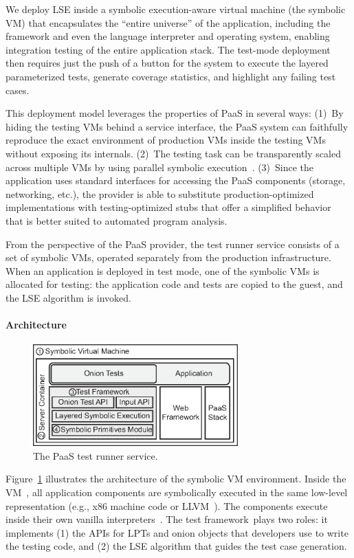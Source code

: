 We deploy LSE inside a symbolic execution-aware virtual machine (the symbolic VM) that encapsulates the ``entire universe'' of the application, including the framework and even the language interpreter and operating system, enabling integration testing of the entire application stack.
%
The test-mode deployment then requires just the push of a button for the system to execute the layered parameterized tests, generate coverage statistics, and highlight any failing test cases.

This deployment model leverages the properties of PaaS in several ways:
%
(1)~By hiding the testing VMs behind a service interface, the PaaS system can faithfully reproduce the exact environment of production VMs inside the testing VMs without exposing its internals.
%
(2)~The testing task can be transparently scaled across multiple VMs by using parallel symbolic execution~\cite{cloud9}.
%
(3)~Since the application uses standard interfaces for accessing the PaaS components (storage, networking, etc.), the provider is able to substitute production-optimized implementations with testing-optimized stubs that offer a simplified behavior that is better suited to automated program analysis.

From the perspective of the PaaS provider, the test runner service consists of a set of symbolic VMs, operated separately from the production infrastructure.  When an application is deployed in test mode, one of the symbolic VMs is allocated for testing: the application code and tests are copied to the guest, and the LSE algorithm is invoked.

\paragraph{Architecture}

\begin{figure}
  \centering
  \includegraphics[width=3.1in]{paas/figures/symbolic-vm}
  \caption{The PaaS test runner service.}
  \label{fig:fse}
\end{figure}

Figure~\ref{fig:fse} illustrates the architecture of the symbolic VM environment.  Inside the VM~\cI, all application components are symbolically executed in the same low-level representation (e.g., x86 machine code or LLVM~\cite{llvm}).  The components execute inside their own vanilla interpreters~\cII.
%
The test framework~\cIII plays two roles: it implements (1) the APIs for LPTs and onion objects that developers use to write the testing code, and (2) the LSE algorithm that guides the test case generation.

